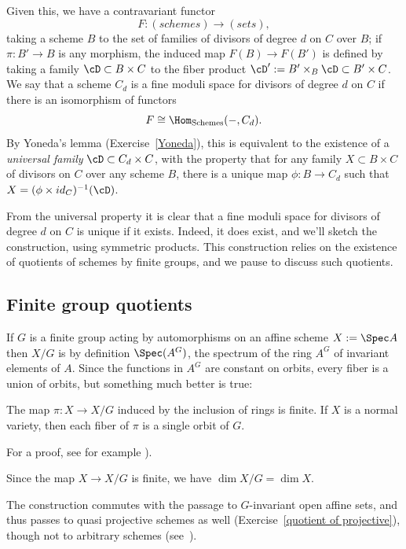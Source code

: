 Given this, we have a contravariant functor 
$$
F : (schemes) \to (sets),
$$
taking a scheme $B$ to the set of families of divisors of degree $d$ on $C$ over $B$; if $\pi : B' \to B$ is any morphism, the induced map $F(B) \to F(B')$ is defined by taking a family $\cD \subset B \times C$ to the fiber product $\cD' :=  B' \times_B \cD \subset B' \times C$. We say that a scheme $C_d$ is a fine moduli space for divisors of degree $d$ on $C$ if there is an isomorphism of functors
$$
F \cong \Hom_{\rm{Schemes}}( -, C_d).
$$
By Yoneda's lemma (Exercise~\ref{Yoneda}), this is equivalent to the existence of a \emph{universal family} $\cD \subset C_d \times C$, with the property that for any family $X \subset B \times C$ of divisors on $C$ over any scheme $B$, there is a unique map $\phi : B \to C_d$ such that $X = (\phi \times id_{C})^{-1}(\cD)$.

From the universal property it is clear that a fine moduli space for divisors of degree $d$ on $C$ is unique if it exists. Indeed, it does exist, and we'll sketch the construction, using symmetric products. This construction relies on the existence of quotients of schemes by finite groups, and we pause to discuss such quotients.

\subsection{Finite group quotients}


If $G$ is a finite group acting by automorphisms on an affine scheme $X:=\Spec A$ then $X/G$ is by definition $\Spec(A^G)$, the spectrum of the ring $A^G$ of invariant elements of $A$. Since the functions in $A^{G}$
are constant on orbits, every fiber is a union of orbits, but something much better is true:

\begin{theorem}\label{finite invariant theory}
 The map $\pi: X\to X/G$ induced by the inclusion of rings is finite. If $X$ is a normal variety, then each fiber of $\pi$  is a single orbit of $G$.
 \end{theorem}

For a proof, see for example \cite[Proposition 13.10]{Eisenbud1995}).  

Since the map $X\to X/G$ is finite, we have $\dim X/G = \dim X$. 

The construction commutes with the passage to $G$-invariant open affine sets, and thus passes to quasi projective schemes as well (Exercise~\ref{quotient of projective}), though not to arbitrary schemes (see~\cite[Example 5.3.2]{Olsson}).

